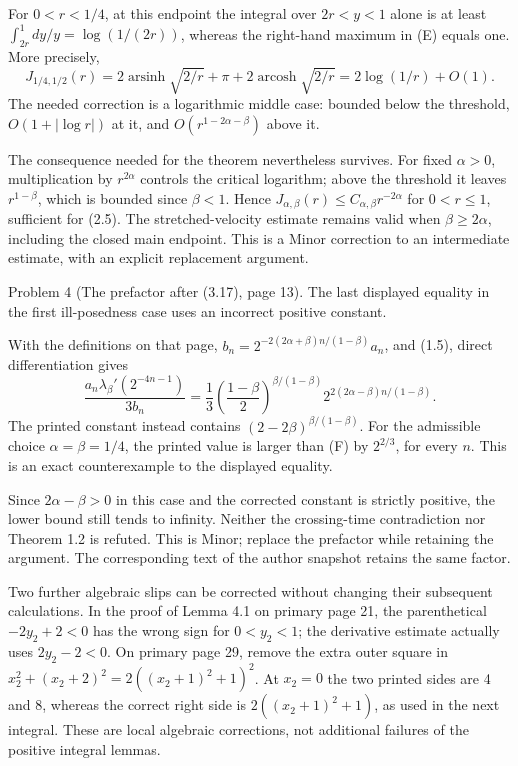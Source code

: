 \documentclass[10pt]{article}
\begin{document}
For \(0<r<1/4\), at this endpoint the integral over \(2r<y<1\) alone is at least \(\int_{2r}^1dy/y=\log(1/(2r))\), whereas the right-hand maximum in (E) equals one. More precisely, \[J_{1/4,1/2}(r)
 =2\operatorname{arsinh}\sqrt{2/r}+\pi
  +2\operatorname{arcosh}\sqrt{2/r}
 =2\log(1/r)+O(1).\] The needed correction is a logarithmic middle case: bounded below the threshold, \(O(1+|\log r|)\) at it, and \(O(r^{1-2\alpha-\beta})\) above it.\par
The consequence needed for the theorem nevertheless survives. For fixed \(\alpha>0\), multiplication by \(r^{2\alpha}\) controls the critical logarithm; above the threshold it leaves \(r^{1-\beta}\), which is bounded since \(\beta<1\). Hence \(J_{\alpha,\beta}(r)\le C_{\alpha,\beta}r^{-2\alpha}\) for \(0<r\le1\), sufficient for (2.5). The stretched-velocity estimate remains valid when \(\beta\ge2\alpha\), including the closed main endpoint. This is a Minor correction to an intermediate estimate, with an explicit replacement argument.\par
Problem 4 (The prefactor after (3.17), page 13).  The last displayed equality in the first ill-posedness case uses an incorrect positive constant.\par
With the definitions on that page, \(b_n=2^{-2(2\alpha+\beta)n/(1-\beta)}a_n\), and (1.5), direct differentiation gives \[\frac{a_n\lambda_\beta'(2^{-4n-1})}{3b_n}
 =\frac13\left(\frac{1-\beta}{2}\right)^{\beta/(1-\beta)}
           2^{2(2\alpha-\beta)n/(1-\beta)}.
 \tag{F}\] The printed constant instead contains \((2-2\beta)^{\beta/(1-\beta)}\). For the admissible choice \(\alpha=\beta=1/4\), the printed value is larger than (F) by \(2^{2/3}\), for every \(n\). This is an exact counterexample to the displayed equality.\par
Since \(2\alpha-\beta>0\) in this case and the corrected constant is strictly positive, the lower bound still tends to infinity. Neither the crossing-time contradiction nor Theorem 1.2 is refuted. This is Minor; replace the prefactor while retaining the argument. The corresponding text of the author snapshot retains the same factor.\par
Two further algebraic slips can be corrected without changing their subsequent calculations. In the proof of Lemma 4.1 on primary page 21, the parenthetical \(-2y_2+2<0\) has the wrong sign for \(0<y_2<1\); the derivative estimate actually uses \(2y_2-2<0\). On primary page 29, remove the extra outer square in \(x_2^2+(x_2+2)^2=2((x_2+1)^2+1)^2\). At \(x_2=0\) the two printed sides are 4 and 8, whereas the correct right side is \(2((x_2+1)^2+1)\), as used in the next integral. These are local algebraic corrections, not additional failures of the positive integral lemmas.\par
\end{document}
